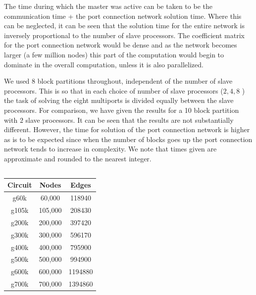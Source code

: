 \documentclass[10pt,psfig,letterpaper,twocolumn]{article}
\begin{document}
The time during which the master was active can be taken to be
the communication time + the port connection network solution time.
Where this can be neglected, it can be seen that the solution time 
for the entire network is inversely proportional to the number of slave 
processors. The coefficient matrix for  the port connection network
would be dense and as the network becomes larger (a few million
nodes) this part of the computation would begin to dominate in the overall
computation, unless it is also parallelized. \par

We used $8$ block partitions throughout, independent of the number of 
slave processors. This is so that in each choice of  
number of slave processors ($2,4,8$ ) the task of solving the eight multiports is divided
equally between the slave processors.
For comparison, we have given the results for a 10 block partition with $2$
slave processors. It can be seen that the results are not substantially different.
However, the time for solution of the port connection network is higher
as is to be expected since when the number of blocks goes up the port connection
network tends to increase in complexity.
We note that times given are approximate and rounded to the nearest
integer. 

\subsection*{}

\begin{table}[htb]
\begin{center}
\begin{tabular}{|c|c|c|} 
\hline
{\bf Circuit}  & {\bf Nodes } & { \bf Edges }   \\ \hline 
g60k&  60,000  &  118940 \\ \hline 
g105k& 105,000 &  208430 \\ \hline 
g200k& 200,000 &  397420 \\ \hline 
g300k& 300,000 &  596170 \\ \hline 
g400k& 400,000 &  795900 \\ \hline 
g500k& 500,000 &  994900 \\ \hline 
g600k& 600,000 &  1194880\\ \hline 
g700k& 700,000 &  1394860\\ \hline 
\end {tabular}
\end {center}
\end {table}
\end{document}
